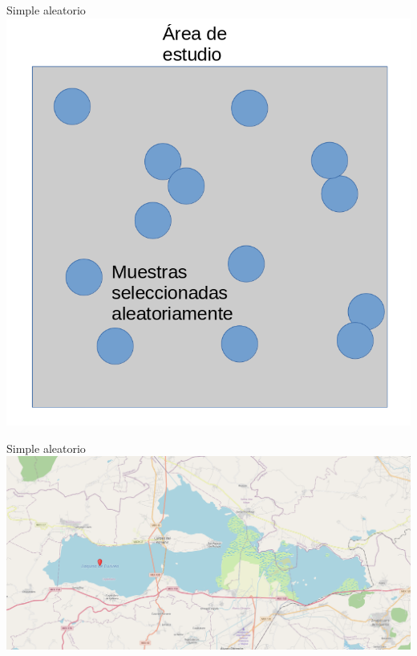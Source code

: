 \documentclass[
  11pt,
  ignorenonframetext,
]{beamer}
\begin{document}
\begin{frame}{Simple aleatorio}
\protect\hypertarget{simple-aleatorio}{}
\includegraphics{Figuras-tecnicas/Simple-aleatorio.png}
\end{frame}

\begin{frame}{Simple aleatorio}
\protect\hypertarget{simple-aleatorio-1}{}
\includegraphics{Figuras-tecnicas/Cuitzeo.png}
\end{frame}
\end{document}
